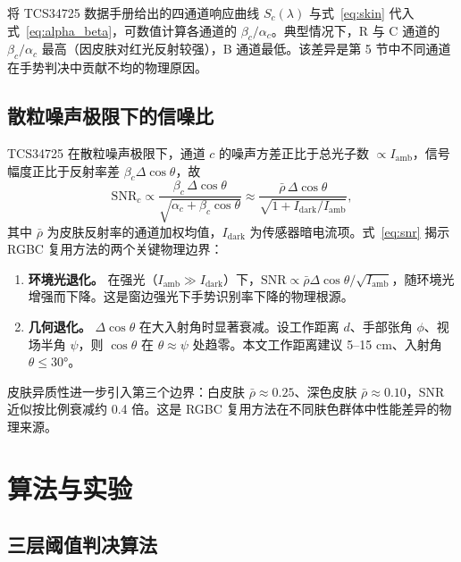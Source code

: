 \documentclass[11pt,a4paper]{ctexart}
\begin{document}
将 TCS34725 数据手册给出的四通道响应曲线 $S_c(\lambda)$ 与式~\eqref{eq:skin} 代入式~\eqref{eq:alpha_beta}，可数值计算各通道的 $\beta_c/\alpha_c$。典型情况下，R 与 C 通道的 $\beta_c/\alpha_c$ 最高（因皮肤对红光反射较强），B 通道最低。该差异是第 5 节中不同通道在手势判决中贡献不均的物理原因。

\subsection{散粒噪声极限下的信噪比}
\label{sec:model_snr}

TCS34725 在散粒噪声极限下，通道 $c$ 的噪声方差正比于总光子数 $\propto I_{\mathrm{amb}}$，信号幅度正比于反射率差 $\beta_c\Delta\cos\theta$，故
\begin{equation}
\mathrm{SNR}_c\propto\frac{\beta_c\,\Delta\cos\theta}{\sqrt{\alpha_c+\beta_c\cos\theta}}\approx\frac{\bar{\rho}\,\Delta\cos\theta}{\sqrt{1+I_{\mathrm{dark}}/I_{\mathrm{amb}}}},
\label{eq:snr}
\end{equation}
其中 $\bar{\rho}$ 为皮肤反射率的通道加权均值，$I_{\mathrm{dark}}$ 为传感器暗电流项。式~\eqref{eq:snr} 揭示 RGBC 复用方法的两个关键物理边界：
\begin{enumerate}[label=(\arabic*),leftmargin=2.2em]
  \item \textbf{环境光退化。} 在强光（$I_{\mathrm{amb}}\gg I_{\mathrm{dark}}$）下，$\mathrm{SNR}\propto\bar{\rho}\Delta\cos\theta/\sqrt{I_{\mathrm{amb}}}$，随环境光增强而下降。这是窗边强光下手势识别率下降的物理根源。
  \item \textbf{几何退化。} $\Delta\cos\theta$ 在大入射角时显著衰减。设工作距离 $d$、手部张角 $\phi$、视场半角 $\psi$，则 $\cos\theta$ 在 $\theta\approx\psi$ 处趋零。本文工作距离建议 5--15 cm、入射角 $\theta\le 30°$。
\end{enumerate}

皮肤异质性进一步引入第三个边界：白皮肤 $\bar{\rho}\approx 0.25$、深色皮肤 $\bar{\rho}\approx 0.10$，SNR 近似按比例衰减约 0.4 倍。这是 RGBC 复用方法在不同肤色群体中性能差异的物理来源。

\section{算法与实验}
\label{sec:algo}

\subsection{三层阈值判决算法}
\label{sec:algo_threshold}
\end{document}
